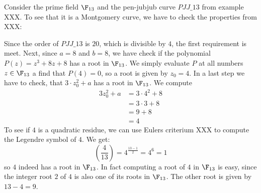 \begin{example}Consider the prime field $\F_{13}$ and the pen-jubjub curve $\mathit{PJJ\_13}$ from example XXX. To see that it is a Montgomery curve, we have to check the properties from XXX: 

Since the order  of $\mathit{PJJ\_13}$ is $20$, which is divisible by $4$, the first requirement is meet. Next, since $a=8$ and $b=8$, we have check if the polynomial $P(z) = z^3 + 8z + 8$ has a root in $\F_{13}$. We simply evaluate $P$ at all numbers $z\in \F_{13}$ a find that $P(4)=0$, so a root is given by $z_0=4$. In a last step we have to check, that $3\cdot z_0^2 + a$ has a root in $\F_{13}$. We compute
\begin{align*}
3z_0^2 + a & = 3\cdot 4^2 + 8 \\
           & = 3 \cdot 3 + 8 \\
           & = 9 + 8 \\
           & = 4
\end{align*}
To see if $4$ is a quadratic residue, we can use Eulers criterium XXX to compute the Legendre symbol of $4$. We get:
$$
\left(\frac{4}{13}\right) = 4^{\frac{13-1}{2}} = 4^6 = 1
$$ 
so $4$ indeed has a root in $\F_{13}$. In fact computing a root of $4$ in $\F_{13}$ is easy, since the integer root $2$ of $4$ is also one of its roots in $\F_{13}$. The other root is given by $13-4=9$.


\end{example}
